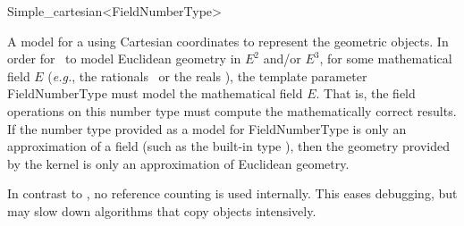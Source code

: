 \begin{ccRefClass}{Simple_cartesian<FieldNumberType>}


\ccDefinition
A model for a  using Cartesian coordinates to represent the
geometric objects. In order for \ccRefName\ to model Euclidean geometry
in $E^2$ and/or $E^3$, for some mathematical field $E$ (\textit{e.g.},
the rationals \Q\ or the reals \R), the template parameter FieldNumberType      
must model the mathematical field $E$.  That is, the field operations on this
number type must compute the mathematically correct results.  If the number
type provided as a model for FieldNumberType is only an approximation of a
field (such as the built-in type ), then the geometry provided by
the kernel is only an approximation of Euclidean geometry.  


\ccIsModel
{}

\ccTypes
{}
\ccGlue
{}

\ccImplementation In contrast to , no reference counting
is used internally. This eases debugging, but may slow down algorithms
that copy objects intensively.

\ccSeeAlso
{} \\
 \\
 \\

\end{ccRefClass}
